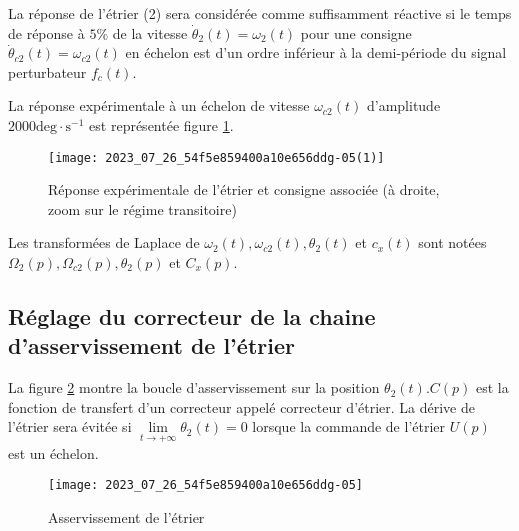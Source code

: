 La réponse de l'étrier (2) sera considérée comme suffisamment réactive si le temps de réponse à $5 \%$ de la vitesse $\dot{\theta}_{2}(t)=\omega_{2}(t)$ pour une consigne $\dot{\theta}_{c 2}(t)=\omega_{c 2}(t)$ en échelon est d'un ordre inférieur à la demi-période du signal perturbateur $f_{c}(t)$.

La réponse expérimentale à un échelon de vitesse $\omega_{c 2}(t)$ d'amplitude $2000 \mathrm{deg} \cdot \mathrm{s}^{-1}$ est représentée figure \ref{fig_ccspsi2022:07}.

\begin{figure}[!h]
\centering
\texttt{[image: 2023\_07\_26\_54f5e859400a10e656ddg-05(1)]}
\caption{\label{fig_ccspsi2022:07}Réponse expérimentale de l'étrier et consigne associée (à droite, zoom sur le régime transitoire)}
\end{figure}

Les transformées de Laplace de $\omega_{2}(t), \omega_{c 2}(t), \theta_{2}(t)$ et $c_{x}(t)$ sont notées $\Omega_{2}(p), \Omega_{c 2}(p), \theta_{2}(p)$ et $C_{x}(p)$.


\subsection{\label{sec:II.B} Réglage du correcteur de la chaine d'asservissement de l'étrier}
La figure \ref{fig_ccspsi2022:08} montre la boucle d'asservissement sur la position $\theta_{2}(t) . C(p)$ est la fonction de transfert d'un correcteur appelé correcteur d'étrier. La dérive de l'étrier sera évitée si $\lim\limits_{t \rightarrow+\infty} \theta_{2}(t)=0$ lorsque la commande de l'étrier $U(p)$ est un échelon.

\begin{figure}[!h]
\centering
\texttt{[image: 2023\_07\_26\_54f5e859400a10e656ddg-05]}
\caption{\label{fig_ccspsi2022:08}Asservissement de l'étrier}
\end{figure}

